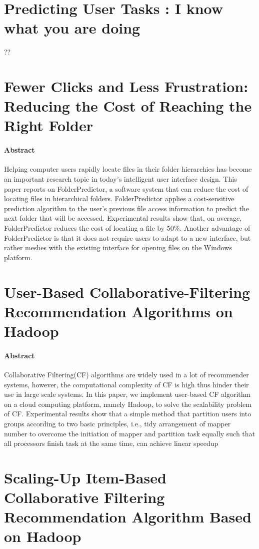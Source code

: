\documentclass[oneside]{book}
\begin{document}
\section{Predicting User Tasks : I know what you are doing}
??
\section{Fewer Clicks and Less Frustration: Reducing the Cost of Reaching the Right Folder }
\paragraph{Abstract}
Helping computer users rapidly locate files in their folder hierarchies has become an important research topic in today's intelligent user interface design. This paper reports on FolderPredictor, a software system that can reduce the cost of locating files in hierarchical folders. FolderPredictor applies a cost-sensitive prediction algorithm to the user's previous file access information to predict the next folder that will be accessed. Experimental results show that, on average, FolderPredictor reduces the cost of locating a file by 50\%. Another advantage of FolderPredictor is that it does not require users to adapt to a new interface, but rather meshes with the existing interface for opening files on the Windows platform.
\section{User-Based Collaborative-Filtering Recommendation Algorithms on Hadoop}
\paragraph{Abstract}
Collaborative Filtering(CF) algorithms are widely used in a lot of recommender systems, however, the computational complexity of CF is high thus hinder their use in large scale systems. In this paper, we implement user-based CF algorithm on a cloud computing platform, namely Hadoop, to solve the scalability problem of CF. Experimental results show that a simple method that partition users into groups according to two basic principles, i.e., tidy arrangement of mapper number to overcome the initiation of mapper and partition task equally such that all processors finish task at the same time, can achieve linear speedup
\section{Scaling-Up Item-Based Collaborative Filtering Recommendation Algorithm Based on Hadoop}
\end{document}
